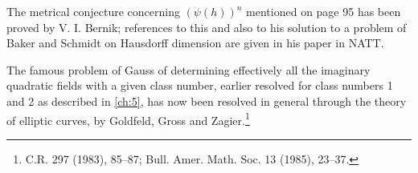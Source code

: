 The metrical conjecture concerning \((\psi(h))^n\) mentioned on page 95 has been proved by V. I. Bernik; references to this and also to his solution to a problem of Baker and Schmidt on Hausdorff dimension are given in his paper in NATT.

The famous problem of Gauss of determining effectively all the imaginary quadratic fields with a given class number, earlier resolved for class numbers 1 and 2 as described in \autoref{ch:5}, has now been resolved in general through the theory of elliptic curves, by Goldfeld, Gross and Zagier.\footnote{C.R. 297 (1983), 85--87; Bull. Amer. Math. Soc. 13 (1985), 23--37.}
